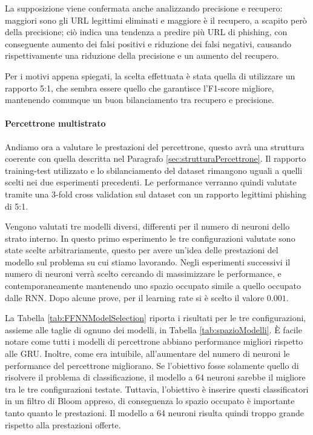 \documentclass[../../main.tex]{subfiles}
\begin{document}
    La supposizione viene confermata anche analizzando precisione e recupero: maggiori sono gli URL legittimi eliminati e maggiore è il recupero, a scapito però della precisione; ciò indica una tendenza a predire più URL di phishing, con conseguente aumento dei falsi positivi e riduzione dei falsi negativi, causando rispettivamente una riduzione della precisione e un aumento del recupero.

    Per i motivi appena spiegati, la scelta effettuata è stata quella di utilizzare un rapporto 5:1, che sembra essere quello che garantisce l'F1-score migliore, mantenendo comunque un buon bilanciamento tra recupero e precisione.

    \paragraph{Percettrone multistrato}

    Andiamo ora a valutare le prestazioni del percettrone, questo avrà una struttura coerente con quella descritta nel Paragrafo \ref{sec:strutturaPercettrone}. Il rapporto training-test utilizzato e lo sbilanciamento del dataset rimangono uguali a quelli scelti nei due esperimenti precedenti. Le performance verranno quindi valutate tramite una 3-fold cross validation sul dataset con un rapporto legittimi phishing di 5:1.

    Vengono valutati tre modelli diversi, differenti per il numero di neuroni dello strato interno. In questo primo esperimento le tre configurazioni valutate sono state scelte arbitrariamente, questo per avere un'idea delle prestazioni del modello sul problema su cui stiamo lavorando. Negli esperimenti successivi il numero di neuroni verrà scelto cercando di massimizzare le performance, e contemporaneamente mantenendo uno spazio occupato simile a quello occupato dalle RNN. Dopo alcune prove, per il learning rate si è scelto il valore $0.001$.

    La Tabella \ref{tab:FFNNModelSelection} riporta i risultati per le tre configurazioni, assieme alle taglie di ognuno dei modelli, in Tabella \ref{tab:spazioModelli}. È facile notare come tutti i modelli di percettrone abbiano performance migliori rispetto alle GRU. Inoltre, come era intuibile, all'aumentare del numero di neuroni le performance del percettrone migliorano. Se l'obiettivo fosse solamente quello di risolvere il problema di classificazione, il modello a 64 neuroni sarebbe il migliore tra le tre configurazioni testate. Tuttavia, l'obiettivo è inserire questi classificatori in un filtro di Bloom appreso, di conseguenza lo spazio occupato è importante tanto quanto le prestazioni. Il modello a 64 neuroni risulta quindi troppo grande rispetto alla prestazioni offerte.
    
\end{document}
